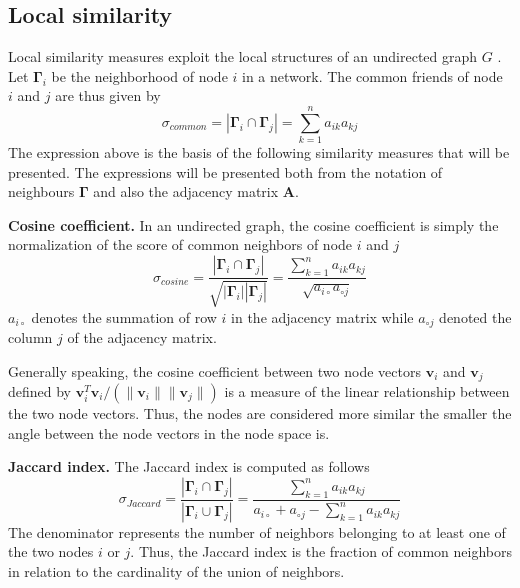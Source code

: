 \subsection{Local similarity}
Local similarity measures exploit the local structures of an undirected graph $G$ \cite{fouss2016algorithms}. Let $\bm{\Gamma}_i$ be the neighborhood of node $i$ in a network. The common friends of node $i$ and $j$ are thus given by
\begin{equation}
\label{common}
\sigma_{common} = |\bm{\Gamma}_i \cap \bm{\Gamma}_j| = \sum_{k=1}^n a_{ik}a_{kj}
\end{equation}
The expression above is the basis of the following similarity measures that will be presented. The expressions will be presented both from the notation of neighbours $\bm{\Gamma}$ and also the adjacency matrix $\textbf{A}$.

\textbf{Cosine coefficient.} In an undirected graph, the cosine coefficient is simply the normalization of the score of common neighbors of node $i$ and $j$ \cite{fouss2016algorithms}
\begin{equation}
    \label{cosine}
    \sigma_{cosine} = \frac{|\bm{\Gamma}_i \cap \bm{\Gamma}_j|}{\sqrt{|\bm{\Gamma}_i||\bm{\Gamma}_j|}} = \frac{\sum_{k=1}^n a_{ik}a_{kj}}{\sqrt{a_{i \circ }a_{\circ j}}}
\end{equation}
$a_{i \circ }$ denotes the summation of row $i$ in the adjacency matrix while $a_{\circ j}$ denoted the column $j$ of the adjacency matrix.

Generally speaking, the cosine coefficient between two node vectors $\textbf{v}_i$ and $\textbf{v}_j$ defined by $\textbf{v}_i^T\textbf{v}_i/(\|\textbf{v}_i\|\|\textbf{v}_j\|)$ is a measure of the linear relationship between the two node vectors. Thus, the nodes are considered more similar the smaller the angle between the node vectors in the node space is.

\textbf{Jaccard index.} The Jaccard index is computed as follows
\begin{equation}
    \label{jaccard}
    \sigma_{Jaccard} = \frac{|\bm{\Gamma}_i \cap \bm{\Gamma}_j|}{|\bm{\Gamma}_i \cup \bm{\Gamma}_j|} = \frac{\sum_{k=1}^n a_{ik}a_{kj}}{a_{i \circ }+a_{\circ j}-\sum_{k=1}^n a_{ik}a_{kj}}
\end{equation}
The denominator represents the number of neighbors belonging to at least one of the two nodes $i$ or $j$. Thus, the Jaccard index is the fraction of common neighbors in relation to the cardinality of the union of neighbors. 

